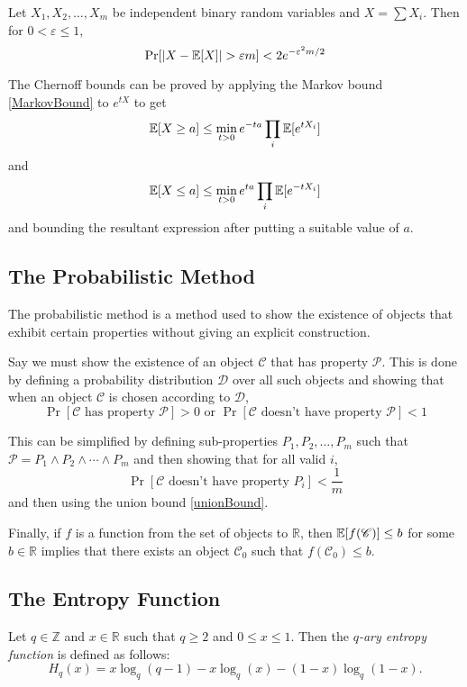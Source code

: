 \begin{theorem}
\label{addChernoff}
    Let $X_1,X_2,\ldots,X_m$ be independent binary random variables and $X=\sum X_i$. Then for $0<\varepsilon\leq 1$,
    $$\Pr[|X-\expec[X]|>\varepsilon m]<2e^{-\varepsilon^2m/2}$$
\end{theorem}

The Chernoff bounds can be proved by applying the Markov bound \ref{MarkovBound} to $e^{tX}$ to get
$$\mathbb{E}[X\geq a]\leq \min_{t>0} e^{-ta}\prod_i\mathbb{E}[e^{tX_i}]$$
and
$$\mathbb{E}[X\leq a]\leq \min_{t>0} e^{ta}\prod_i\mathbb{E}[e^{-tX_i}]$$
and bounding the resultant expression after putting a suitable value of $a$.

\subsection{The Probabilistic Method}
\label{probabilisticMethod}

The probabilistic method is a method used to show the existence of objects that exhibit certain properties without giving an explicit construction.

Say we must show the existence of an object $\mathscr{C}$ that has property $\mathscr{P}$. This is done by defining a probability distribution $\mathscr{D}$ over all such objects and showing that when an object $\mathscr{C}$ is chosen according to $\mathscr{D}$,
$$\Pr[\mathscr{C}\text{ has property }\mathscr{P}]>0\text{ or }\Pr[\mathscr{C}\text{ doesn't have property }\mathscr{P}]<1$$

This can be simplified by defining sub-properties $P_1,P_2,\ldots,P_m$ such that
$\mathscr{P}=P_1\wedge P_2\wedge\cdots\wedge P_m$ and then showing that for all valid $i$,
$$\Pr[\mathscr{C}\text{ doesn't have property }P_i]<\frac{1}{m}$$
and then using the union bound \ref{unionBound}.

\vspace{2mm}
Finally, if $f$ is a function from the set of objects to $\mathbb{R}$, then $\mathbb{E}[f(\mathscr{C})]\leq b$ for some $b\in\mathbb{R}$ implies that there exists an object $\mathscr{C}_0$ such that $f(\mathscr{C}_0)\leq b$.

\subsection{The Entropy Function}

\begin{definition}
    Let $q\in\mathbb{Z}$ and $x\in\mathbb{R}$ such that $q\geq 2$ and $0\leq x\leq 1$. Then the \textit{$q$-ary entropy function} is defined as follows:
    $$H_q(x)=x\log_q(q-1)-x\log_q(x)-(1-x)\log_q(1-x).$$
\end{definition}

